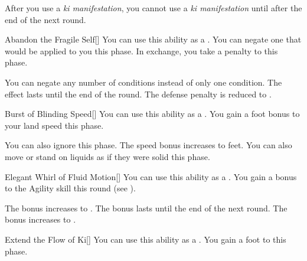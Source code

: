         After you use a \textit{ki manifestation}, you cannot use a \textit{ki manifestation} until after the end of the next round.
        {
            \begin{freeability}{Abandon the Fragile Self}[]
                You can use this ability as a .
                You can negate one  that would be applied to you this phase.
                In exchange, you take a  penalty to  this phase.

                \rankline
                 You can negate any number of conditions instead of only one condition.
                 The effect lasts until the end of the round.
                 The defense penalty is reduced to .
            \end{freeability}

            \begin{freeability}{Burst of Blinding Speed}[]
                You can use this ability as a .
                You gain a  foot bonus to your land speed this phase.

                \rankline
                 You can also ignore  this phase.
                 The speed bonus increases to  feet.
                 You can also move or stand on liquids as if they were solid this phase.
            \end{freeability}

            \begin{freeability}{Elegant Whirl of Fluid Motion}[]
                You can use this ability as a .
                You gain a  bonus to the Agility skill this round (see ).

                \rankline
                 The bonus increases to .
                 The bonus lasts until the end of the next round.
                 The bonus increases to .
            \end{freeability}

            \begin{freeability}{Extend the Flow of Ki}[]
                You can use this ability as a .
                You gain a  foot  to  this phase.


\end{freeability}}
